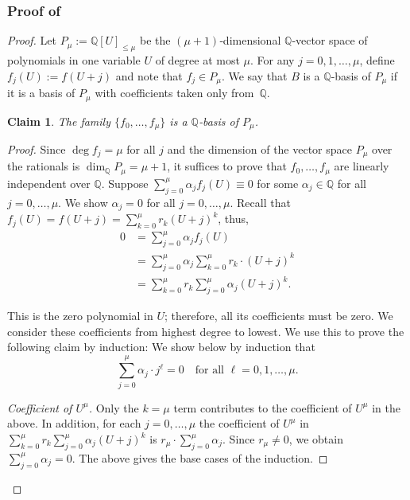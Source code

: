 \documentclass{article}
\theoremstyle{plain}
\newtheorem{claim}[theorem]{Claim}
\theoremstyle{definition}
\theoremstyle{remark}
\begin{document}
\subsubsection*{Proof of }
\begin{proof}
	
	Let $P_{\mu} := \mathbb{Q}[U]_{\le \mu}$ be the $(\mu+1)$‑dimensional $\mathbb{Q}$‑vector
	space of polynomials in one variable $U$ of degree at most $\mu$.
	For any $j=0,1,\dots,\mu$, define $f_j(U) := f(U+j)$ and note that $f_j \in P_{\mu}$. We say that $B$ is a $\mathbb{Q}$‑basis of $P_{\mu}$ if it is a basis of $P_{\mu}$ with coefficients taken only from~$\mathbb{Q}$. 
	
	\begin{claim}\label{lem:basis}
		The family $\{f_0,\dots,f_{\mu}\}$ is a $\mathbb{Q}$‑basis of $P_{\mu}$.
	\end{claim}
	
	\begin{proof}
		Since $\deg f_j = {\mu}$ for all $j$ and the dimension of the vector space $P_{\mu}$ over the rationals is $\dim_{\mathbb{Q}} P_{\mu} = {\mu}+1$,
		it suffices to prove that $f_0,\dots,f_{\mu}$ are linearly independent
		over $\mathbb{Q}$.
		Suppose
		$
		\sum_{j=0}^{\mu} \alpha_j f_j(U) \equiv 0
		$ for some $\alpha_j \in \mathbb{Q}$ for all $j = 0,\ldots, {\mu}$.
		We show $\alpha_j = 0$ for all $j = 0,\ldots, {\mu}$.
Recall that 
		$
		f_j(U)
		= f(U+j)
		= \sum_{k=0}^{\mu} r_k (U+j)^k
		$,
		thus, 
		\begin{align*}
		0
		&= \sum_{j=0}^{\mu} \alpha_j f_j(U)\\
		&=  \sum_{j=0}^{\mu}  \alpha_j  \sum_{k=0}^{\mu} r_k \cdot (U+j)^k\\
		&= \sum_{k=0}^{\mu} r_k  \sum_{j=0}^{\mu} \alpha_j (U+j)^k.
		\end{align*}

		This is the zero polynomial in $U$; therefore, all its coefficients must be zero. We consider these coefficients from highest degree to lowest. We use this to prove the following claim by induction:
		We show below by induction that \[
		\sum_{j=0}^{\mu} \alpha_j \cdot j^\ell = 0
		\quad\text{for all } \ell = 0,1,\dots,{\mu}.
		\]
		
		
		\emph{Coefficient of $U^{\mu}$.}
		Only the $k={\mu}$ term contributes to the coefficient of $U^{\mu}$ in the above. In addition, for each $j = 0,\ldots,{\mu}$ the coefficient of $U^{\mu}$ in $\sum_{k=0}^{\mu} r_k  \sum_{j=0}^{\mu} \alpha_j (U+j)^k$ is
		$r_{\mu} \cdot \sum_{j=0}^{\mu} \alpha_j$.
		Since $r_{\mu} \neq 0$, we obtain
	$
		\sum_{j=0}^{\mu} \alpha_j = 0
		$. 
		The above gives the base cases of the induction. 
		

\end{proof}
\end{proof}
\end{document}
